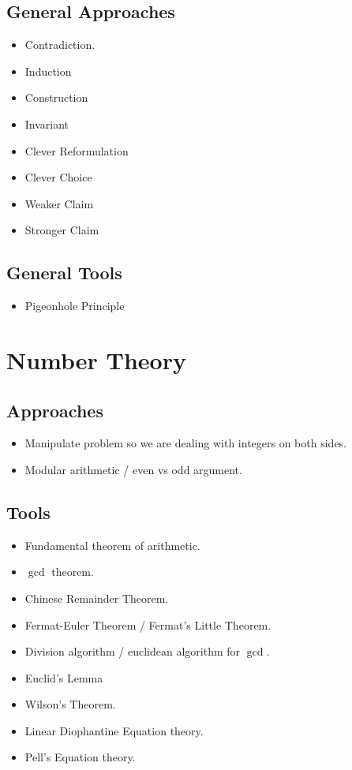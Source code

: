 \documentclass[12pt]{amsart}
\begin{document}
\begin{multicols}{2}
\subsection{General Approaches}
\begin{itemize}
    \item Contradiction.
    \item Induction
    \item Construction
    \item Invariant
    \item Clever Reformulation
    \item Clever Choice
    \item Weaker Claim
    \item Stronger Claim
\end{itemize}

\subsection{General Tools}
\begin{itemize}
    \item Pigeonhole Principle
\end{itemize}
\section{Number Theory}
\subsection{Approaches}
\begin{itemize}
    \item Manipulate problem so we are dealing with integers on both sides.
    \item Modular arithmetic / even vs odd argument.
\end{itemize}
\subsection{Tools}
\begin{itemize}
    \item Fundamental theorem of arithmetic.
    \item $\gcd$ theorem.
    \item Chinese Remainder Theorem.
    \item Fermat-Euler Theorem / Fermat's Little Theorem.
    \item Division algorithm / euclidean algorithm for $\gcd$.
    \item Euclid's Lemma
    \item Wilson's Theorem.
    \item Linear Diophantine Equation theory.
    \item Pell's Equation theory.
\end{itemize}


\end{multicols}
\end{document}
